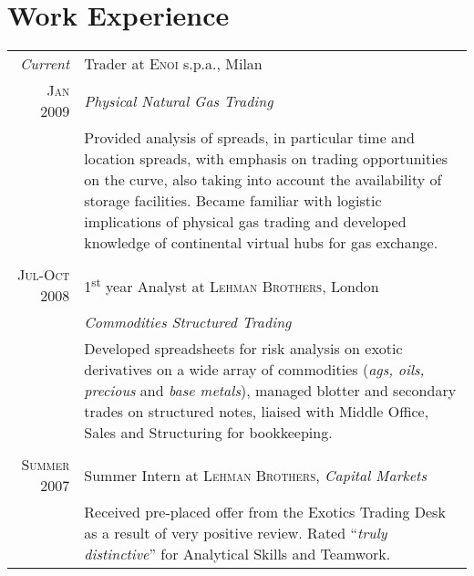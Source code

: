 \documentclass[a4paper,10pt]{article}
\begin{document}
\section{Work Experience}
\begin{tabular}{r|p{11cm}}
	\emph{Current} & Trader at \textsc{Enoi} s.p.a., Milan \\\textsc{Jan 2009}&\emph{Physical Natural Gas Trading}\\&\footnotesize{Provided analysis of spreads, in particular time and location spreads, with emphasis on trading opportunities on the curve, also taking into account the availability of storage facilities. Became familiar with logistic implications of physical gas trading and developed knowledge of continental virtual hubs for gas exchange.}\\\multicolumn{2}{c}{} \\
	\textsc{Jul-Oct 2008} & 1\textsuperscript{st} year Analyst at \textsc{Lehman Brothers}, London \\&\emph{Commodities Structured Trading}\\&\footnotesize{Developed spreadsheets for risk analysis on exotic derivatives on a wide array of commodities (\textit{ags, oils, precious} and \textit{base metals}), managed blotter and secondary trades on structured notes, liaised with Middle Office, Sales and Structuring for bookkeeping.}\\\multicolumn{2}{c}{} \\
	\textsc{Summer 2007} & Summer Intern at \textsc{Lehman Brothers}, \emph{Capital Markets}\\&\footnotesize{Received pre-placed offer from the Exotics Trading Desk as a result of very positive review. Rated ``\emph{truly distinctive}'' for Analytical Skills and Teamwork.}
\end{tabular}

\end{document}
